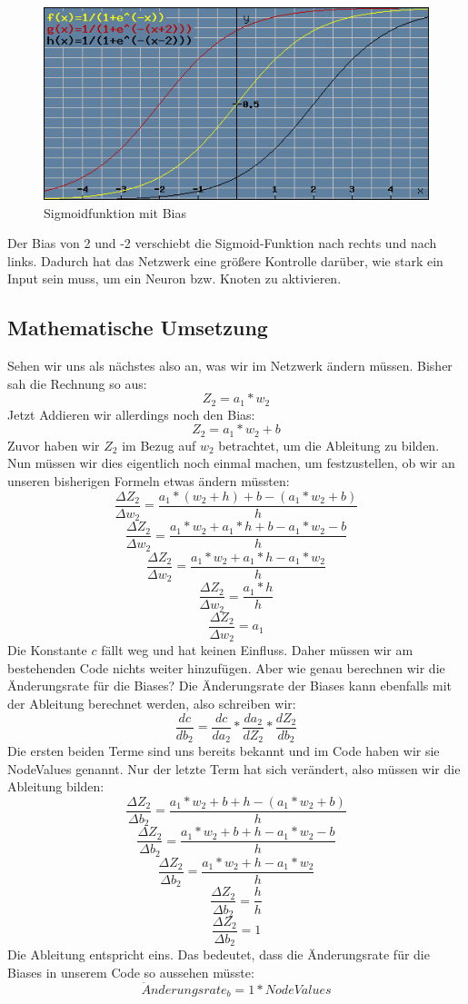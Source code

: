\documentclass[12pt]{article}
\begin{document}
\begin{figure}[H]
\centering
\includegraphics[scale=0.60]{./Images/Pasted image 20231005145933.png}
\caption{Sigmoidfunktion mit Bias}
\label{Sigmoid-Funktion mit Bias}
\end{figure}
Der Bias von 2 und -2 verschiebt die Sigmoid-Funktion nach rechts und nach links. Dadurch hat das Netzwerk eine größere Kontrolle darüber, wie stark ein Input sein muss, um ein Neuron bzw. Knoten zu aktivieren.\subsection{Mathematische Umsetzung}Sehen wir uns als nächstes also an, was wir im Netzwerk ändern müssen. Bisher sah die Rechnung so aus:$$Z_2 = a_1 * w_2$$Jetzt Addieren wir allerdings noch den Bias: $$Z_2 = a_1 * w_2 + b$$
Zuvor haben wir $Z_2$ im Bezug auf $w_2$ betrachtet, um die Ableitung zu bilden. Nun müssen wir dies eigentlich noch einmal machen, um festzustellen, ob wir an unseren bisherigen Formeln etwas ändern müssten:
$$\frac{\Delta Z_2 }{\Delta w_2 } = \frac{ a_1 * (w_2+h) + b -(a_1 * w_2 + b) }{ h }$$
$$\frac{\Delta Z_2 }{\Delta w_2 } = \frac{ a_1*w_2+a_1*h + b -a_1 * w_2 - b }{ h }$$
$$\frac{\Delta Z_2 }{\Delta w_2 } = \frac{ a_1*w_2+a_1*h-a_1 * w_2 }{ h }$$
$$\frac{\Delta Z_2 }{\Delta w_2 } = \frac{a_1*h }{ h }$$
$$\frac{\Delta Z_2 }{\Delta w_2 } = a_1$$
Die Konstante $c$ fällt weg und hat keinen Einfluss. Daher müssen wir am bestehenden Code nichts weiter hinzufügen. Aber wie genau berechnen wir die Änderungsrate für die Biases? Die Änderungsrate der Biases kann ebenfalls mit der Ableitung berechnet werden, also schreiben wir:
$$\frac{ dc }{ db_{ 2 } }=
\frac{ dc }{ da_{ 2 } }*
\frac{ da_{ 2 } }{ dZ_{ 2 } }*
\frac{ dZ_{ 2 } }{ db_{ 2 } }$$
Die ersten beiden Terme sind uns bereits bekannt und im Code haben wir sie NodeValues genannt. Nur der letzte Term hat sich verändert, also müssen wir die Ableitung bilden:
$$\frac{\Delta Z_2 }{\Delta b_2 } = \frac{ a_1 * w_2 + b+h -(a_1 * w_2 + b) }{ h }$$
$$\frac{\Delta Z_2 }{\Delta b_2 } = \frac{ a_1 * w_2 + b+h -a_1 * w_2 - b }{ h }$$
$$\frac{\Delta Z_2 }{\Delta b_2 } = \frac{ a_1 * w_2 +h -a_1 * w_2 }{ h }$$
$$\frac{\Delta Z_2 }{\Delta b_2 } = \frac{ h  }{ h }$$
$$\frac{\Delta Z_2 }{\Delta b_2 } = 1$$
Die Ableitung entspricht eins. Das bedeutet, dass die Änderungsrate für die Biases in unserem Code so aussehen müsste:
$$\ddot{A}nderungsrate_b = 1*NodeValues$$
\end{document}
